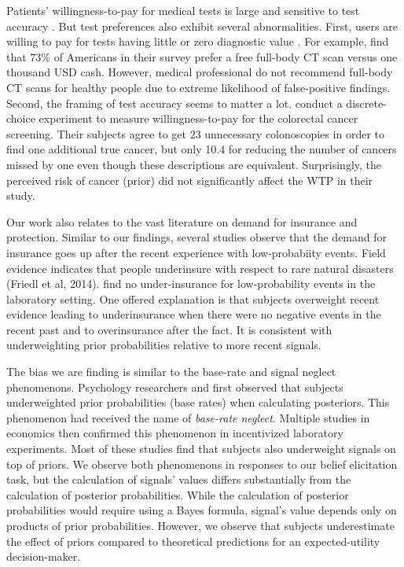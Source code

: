 \documentclass[12pt,a4paper]{article}
\begin{document}
Patients' willingness-to-pay for medical tests is large and sensitive to test accuracy \citep{liang_acceptability_2003, howard_does_2009, neumann_willingness--pay_2012}. But test preferences also exhibit several abnormalities. First, users are willing to pay for tests having little or zero diagnostic value \citep{schwartz_enthusiasm_2004, neumann_willingness--pay_2012}. For example, \citet{schwartz_enthusiasm_2004} find that 73\% of Americans in their survey prefer a free full-body CT scan versus one thousand USD cash. However, medical professional do not recommend full-body CT scans for healthy people due to extreme likelihood of false-positive findings. Second, the framing of test accuracy seems to matter a lot. \citet{howard_does_2009} conduct a discrete-choice experiment to measure willingness-to-pay for the colorectal cancer screening. Their subjects agree to get 23 unnecessary colonoscopies in order to find one additional true cancer, but only 10.4 for reducing the number of cancers missed by one even though these descriptions are equivalent. Surprisingly, the perceived risk of cancer (prior) did not significantly affect the WTP in their study.

Our work also relates to the vast literature on demand for insurance and protection. Similar to our findings, several studies observe that the demand for insurance goes up after the recent experience with low-probabiity events. Field evidence indicates that people underinsure with respect to rare natural disasters (Friedl et al, 2014). \citet{laury_insurance_2009} find no under-insurance for low-probability events in the laboratory setting. One offered explanation \citep{volkman-wise_representativeness_2015} is that subjects overweight recent evidence leading to underinsurance when there were no negative events in the recent past and to overinsurance after the fact. It is consistent with underweighting prior probabilities relative to more recent signals. 

The bias we are finding is similar to the base-rate and signal neglect phenomenons. Psychology researchers \citet{hammerton_case_1973} and \citet{kahneman_psychology_1973} first observed that subjects underweighted prior probabilities (base rates) when calculating posteriors. This phenomenon had received the name of \textit{base-rate neglect}. Multiple studies in economics then confirmed \citep*{grether_testing_1992, holt_update_2009} this phenomenon in incentivized laboratory experiments. Most of these studies find that subjects also underweight signals on top of priors.  We observe both phenomenons in responses to our belief elicitation task, but the calculation of signals' values differs substantially from the calculation of posterior probabilities. While the calculation of posterior probabilities would require using a Bayes formula, signal's value depends only on products of prior probabilities. However, we observe that subjects underestimate the effect of priors compared to theoretical predictions for an expected-utility decision-maker.
\end{document}
